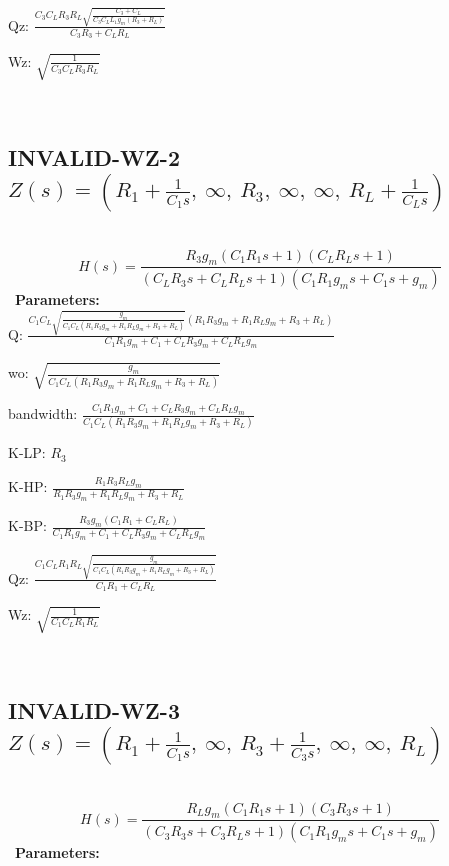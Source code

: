 \documentclass{article}
\begin{document}
Qz: $\frac{C_{3} C_{L} R_{3} R_{L} \sqrt{\frac{C_{3} + C_{L}}{C_{3} C_{L} L_{1} g_{m} \left(R_{3} + R_{L}\right)}}}{C_{3} R_{3} + C_{L} R_{L}}$\ 

Wz: $\sqrt{\frac{1}{C_{3} C_{L} R_{3} R_{L}}}$\ 

\ 

\subsection{INVALID-WZ-2 $Z(s) = \left( R_{1} + \frac{1}{C_{1} s}, \  \infty, \  R_{3}, \  \infty, \  \infty, \  R_{L} + \frac{1}{C_{L} s}\right)$ } \ 
\textbf{\[H(s) = \frac{R_{3} g_{m} \left(C_{1} R_{1} s + 1\right) \left(C_{L} R_{L} s + 1\right)}{\left(C_{L} R_{3} s + C_{L} R_{L} s + 1\right) \left(C_{1} R_{1} g_{m} s + C_{1} s + g_{m}\right)}\] } \ 
\textbf{Parameters:}\\ 

Q: $\frac{C_{1} C_{L} \sqrt{\frac{g_{m}}{C_{1} C_{L} \left(R_{1} R_{3} g_{m} + R_{1} R_{L} g_{m} + R_{3} + R_{L}\right)}} \left(R_{1} R_{3} g_{m} + R_{1} R_{L} g_{m} + R_{3} + R_{L}\right)}{C_{1} R_{1} g_{m} + C_{1} + C_{L} R_{3} g_{m} + C_{L} R_{L} g_{m}}$\ 

wo: $\sqrt{\frac{g_{m}}{C_{1} C_{L} \left(R_{1} R_{3} g_{m} + R_{1} R_{L} g_{m} + R_{3} + R_{L}\right)}}$\ 

bandwidth: $\frac{C_{1} R_{1} g_{m} + C_{1} + C_{L} R_{3} g_{m} + C_{L} R_{L} g_{m}}{C_{1} C_{L} \left(R_{1} R_{3} g_{m} + R_{1} R_{L} g_{m} + R_{3} + R_{L}\right)}$\ 

K-LP: $R_{3}$\ 

K-HP: $\frac{R_{1} R_{3} R_{L} g_{m}}{R_{1} R_{3} g_{m} + R_{1} R_{L} g_{m} + R_{3} + R_{L}}$\ 

K-BP: $\frac{R_{3} g_{m} \left(C_{1} R_{1} + C_{L} R_{L}\right)}{C_{1} R_{1} g_{m} + C_{1} + C_{L} R_{3} g_{m} + C_{L} R_{L} g_{m}}$\ 

Qz: $\frac{C_{1} C_{L} R_{1} R_{L} \sqrt{\frac{g_{m}}{C_{1} C_{L} \left(R_{1} R_{3} g_{m} + R_{1} R_{L} g_{m} + R_{3} + R_{L}\right)}}}{C_{1} R_{1} + C_{L} R_{L}}$\ 

Wz: $\sqrt{\frac{1}{C_{1} C_{L} R_{1} R_{L}}}$\ 

\ 

\subsection{INVALID-WZ-3 $Z(s) = \left( R_{1} + \frac{1}{C_{1} s}, \  \infty, \  R_{3} + \frac{1}{C_{3} s}, \  \infty, \  \infty, \  R_{L}\right)$ } \ 
\textbf{\[H(s) = \frac{R_{L} g_{m} \left(C_{1} R_{1} s + 1\right) \left(C_{3} R_{3} s + 1\right)}{\left(C_{3} R_{3} s + C_{3} R_{L} s + 1\right) \left(C_{1} R_{1} g_{m} s + C_{1} s + g_{m}\right)}\] } \ 
\textbf{Parameters:}\\ 
\end{document}
